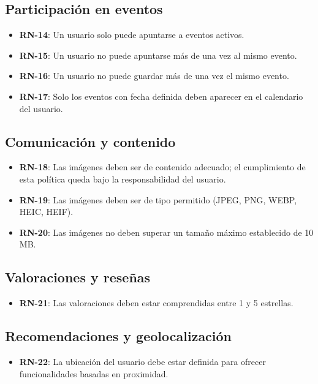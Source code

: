 \subsection{Participación en eventos}

\begin{itemize}
    \item \textbf{RN-14}: Un usuario solo puede apuntarse a eventos activos.
    \item \textbf{RN-15}: Un usuario no puede apuntarse más de una vez al mismo evento.
    \item \textbf{RN-16}: Un usuario no puede guardar más de una vez el mismo evento.
    \item \textbf{RN-17}: Solo los eventos con fecha definida deben aparecer en el calendario del usuario.
\end{itemize}

\subsection{Comunicación y contenido}

\begin{itemize}
    \item \textbf{RN-18}: Las imágenes deben ser de contenido adecuado; el cumplimiento de esta política queda bajo la responsabilidad del usuario.
    \item \textbf{RN-19}: Las imágenes deben ser de tipo permitido (JPEG, PNG, WEBP, HEIC, HEIF).
    \item \textbf{RN-20}: Las imágenes no deben superar un tamaño máximo establecido de 10 MB.
\end{itemize}

\subsection{Valoraciones y reseñas}

\begin{itemize}
    \item \textbf{RN-21}: Las valoraciones deben estar comprendidas entre 1 y 5 estrellas.
\end{itemize}

\subsection{Recomendaciones y geolocalización}

\begin{itemize}
    \item \textbf{RN-22}: La ubicación del usuario debe estar definida para ofrecer funcionalidades basadas en proximidad.
\end{itemize}

